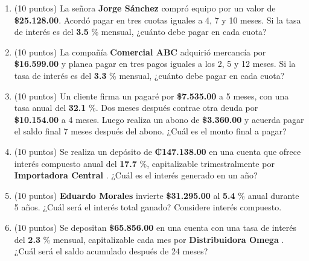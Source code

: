 \documentclass[10pt]{article}
\begin{document}
\begin{enumerate}[leftmargin=*, label=\textbf{\arabic*.}]
  \item (10 puntos) La señora \textbf{ Jorge Sánchez } compró equipo por un valor de \textbf{\$\num{ 25,128.00 }}. Acordó pagar en tres cuotas iguales a 4, 7 y 10 meses. Si la tasa de interés es del \textbf{ 3.5 }\% mensual, ¿cuánto debe pagar en cada cuota?

  \vspace{0.5cm}

  \item (10 puntos) La compañía \textbf{ Comercial ABC } adquirió mercancía por \textbf{\$\num{ 16,599.00 }} y planea pagar en tres pagos iguales a los 2, 5 y 12 meses. Si la tasa de interés es del \textbf{ 3.3 }\% mensual, ¿cuánto debe pagar en cada cuota?

  \vspace{0.5cm}

  \item (10 puntos) Un cliente firma un pagaré por \textbf{\$\num{ 7,535.00 }} a 5 meses, con una tasa anual del \textbf{ 32.1 }\%. Dos meses después contrae otra deuda por \textbf{\$\num{ 10,154.00 }} a 4 meses. Luego realiza un abono de \textbf{\$\num{ 3,360.00 }} y acuerda pagar el saldo final 7 meses después del abono. ¿Cuál es el monto final a pagar?

  \vspace{0.5cm}

  \item (10 puntos) Se realiza un depósito de \textbf{₡\num{ 147.138.00 }} en una cuenta que ofrece interés compuesto anual del \textbf{ 17.7 }\%, capitalizable trimestralmente por \textbf{ Importadora Central }. ¿Cuál es el interés generado en un año?

  \vspace{0.5cm}

  \item (10 puntos) \textbf{ Eduardo Morales } invierte \textbf{\$\num{ 31,295.00 }} al \textbf{ 5.4 }\% anual durante 5 años. ¿Cuál será el interés total ganado? Considere interés compuesto.

  \vspace{0.5cm}

  \item (10 puntos) Se depositan \textbf{\$\num{ 65,856.00 }} en una cuenta con una tasa de interés del \textbf{ 2.3 }\% mensual, capitalizable cada mes por \textbf{ Distribuidora Omega }. ¿Cuál será el saldo acumulado después de 24 meses?
\end{enumerate}
\end{document}
